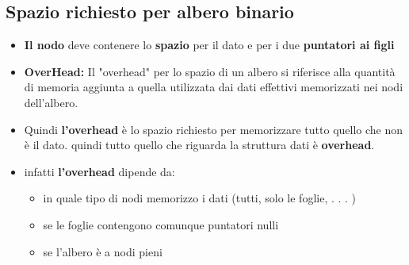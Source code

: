 \subsection{Spazio richiesto per albero binario}
\begin{itemize}
    \subsubsection{Struttura}
    \item \textbf{Il nodo} deve contenere lo \textbf{spazio} per il dato e per i due \textbf{puntatori ai figli}
    \item \textbf{OverHead:} Il "overhead" per lo spazio di un albero si riferisce alla quantità di memoria aggiunta a quella utilizzata dai dati effettivi memorizzati nei nodi dell'albero.
    \item Quindi \textbf{l'overhead} è lo spazio richiesto per memorizzare tutto quello che non è il dato. quindi tutto quello che riguarda la struttura dati è \textbf{overhead}.
    
    \item  infatti \textbf{l'overhead} dipende da:
    \begin{itemize}
        \item in quale tipo di nodi memorizzo i dati (tutti, solo le foglie, . . . )
        \item se le foglie contengono comunque puntatori nulli
        \item se l’albero è a nodi pieni
    \end{itemize}
    \newpage

\end{itemize}
